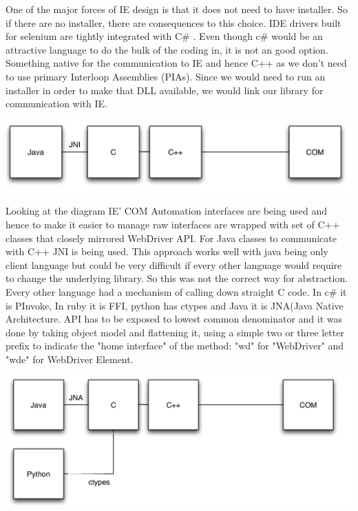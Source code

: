 \documentclass[12pt]{report}
\begin{document}
One of the major forces of IE design is that it does not need to have installer. So if there are no installer, there are consequences to this choice. IDE drivers built for selenium are tightly integrated with C\# . Even though c\# would be an attractive language to do the bulk of the coding in, it is not an good option. Something native for the communication to IE and hence C++ as we don’t need to use primary Interloop Assemblies (PIAs). Since we would need to run an installer in order to make that DLL available, we would link our library for communication with IE.

\includegraphics[scale=1]{IEDriver}

Looking at the diagram IE’ COM Automation interfaces are being used and hence to make it easier to manage raw interfaces are wrapped with set of C++ classes that closely mirrored WebDriver API. For Java classes to communicate with C++ JNI is being used. This approach works well with java being only client language but could be very difficult if every other language would require to change the underlying library. So this was not the correct way for abstraction. Every other language had a mechanism of calling down straight C code. In c\# it is PInvoke, In ruby it is FFI, python has ctypes and Java it is JNA(Java Native Architecture. API has to be exposed to lowest common denominator and it was done by taking object model and flattening it, using a simple two or three letter prefix to indicate the "home interface" of the method: "wd" for "WebDriver" and "wde" for WebDriver Element.

\includegraphics[scale=1]{IEDrivermodified}
\end{document}
